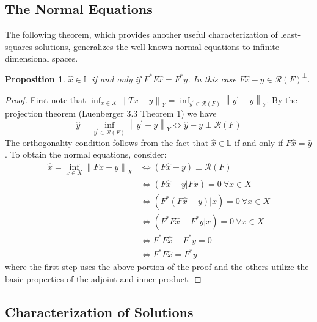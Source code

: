 \documentclass[12pt]{article}
\newcommand*{\norm}[1]{\left\lVert#1\right\rVert}
\newcommand{\R}{\mathcal{R}}
\newtheorem{prop}{Proposition}
\begin{document}
\subsection{The Normal Equations}

The following theorem, which provides another useful characterization of least-squares solutions, 
 generalizes the well-known normal equations to infinite-dimensional spaces. 

\begin{prop} 
$\hat{x} \in \mathbb{L}$ if and only if $F^* F\hat{x} = F^* y$. In this case $F\hat{x} - y \in \R(F)^\perp$.
\end{prop} 

\begin{proof} 
First note that $\inf_{x \in X} \norm{Tx - y}_Y = \inf_{y^\prime \in \R(F)} \norm{y^\prime - y}_Y$. By the projection theorem (Luenberger 3.3 Theorem 1) we have \[\hat{y} = \inf_{y^\prime \in \R(F)} \norm{y^\prime - y}_Y \iff \hat{y} - y \perp \R(F)\] 
The orthogonality condition follows from the fact that $\hat{x} \in \mathbb{L}$ if and only if $F\hat{x} = \hat{y}$. 
To obtain the normal equations, consider: 
\begin{align*} 
\hat{x} = \inf_{x \in X} \norm{Fx - y}_X &\iff (F\hat{x} - y) \perp \R(F) \\
                                                            &\iff (F\hat{x} - y| Fx) = 0 \ \forall x \in X \\
                                                            &\iff (F^*(F\hat{x} - y)| x) = 0 \ \forall x \in X \\
                                                            &\iff (F^*F\hat{x} - F^*y| x) = 0 \ \forall x \in X \\
                                                            &\iff F^*F\hat{x} - F^*y = 0 \\
                                                            &\iff F^*F\hat{x} = F^*y                                                            
\end{align*} 
where the first step uses the above portion of the proof and the others utilize the basic properties of the adjoint and inner product.
\end{proof} 

\subsection{Characterization of Solutions}
\end{document}

